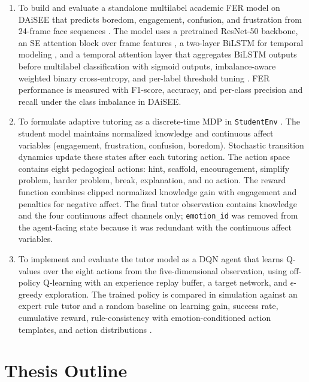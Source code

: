 \begin{enumerate}
  \item To build and evaluate a standalone multilabel academic FER model on DAiSEE that predicts boredom, engagement, confusion, and frustration from 24-frame face sequences \cite{gupta_daisee_2016,mehta_three-dimensional_2022}. The model uses a pretrained ResNet-50 backbone, an SE attention block over frame features \cite{hu_squeeze_2018}, a two-layer BiLSTM for temporal modeling \cite{asaju_adaptive_2022,liu_dynamic_nodate}, and a temporal attention layer that aggregates BiLSTM outputs before multilabel classification with sigmoid outputs, imbalance-aware weighted binary cross-entropy, and per-label threshold tuning \cite{aly_comprehensive_2025}. FER performance is measured with F1-score, accuracy, and per-class precision and recall under the class imbalance in DAiSEE.
  \item To formulate adaptive tutoring as a discrete-time MDP in \texttt{StudentEnv} \cite{axak_adaptive_nodate,azoulay_adaptive_2021}. The student model maintains normalized knowledge and continuous affect variables (engagement, frustration, confusion, boredom). Stochastic transition dynamics update these states after each tutoring action. The action space contains eight pedagogical actions: hint, scaffold, encouragement, simplify problem, harder problem, break, explanation, and no action. The reward function combines clipped normalized knowledge gain with engagement and penalties for negative affect. The final tutor observation contains knowledge and the four continuous affect channels only; \texttt{emotion\_id} was removed from the agent-facing state because it was redundant with the continuous affect variables.
  \item To implement and evaluate the tutor model as a DQN agent \cite{mnih_dqn_2015} that learns Q-values over the eight actions from the five-dimensional observation, using off-policy Q-learning with an experience replay buffer, a target network, and $\epsilon$-greedy exploration. The trained policy is compared in simulation against an expert rule tutor and a random baseline on learning gain, success rate, cumulative reward, rule-consistency with emotion-conditioned action templates, and action distributions \cite{fernandez-herrero_evaluating_2024,yuvaraj_affective_2025,lek_academic_2023}.
\end{enumerate}

\section{Thesis Outline}\label{sec:outline}

